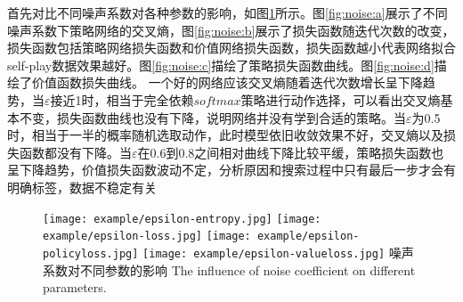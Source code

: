 首先对比不同噪声系数对各种参数的影响，如图\ref{fig:noise}所示。图\ref{fig:noise:a}展示了不同噪声系数下策略网络的交叉熵，图\ref{fig:noise:b}展示了损失函数随迭代次数的改变，损失函数包括策略网络损失函数和价值网络损失函数，损失函数越小代表网络拟合self-play数据效果越好。图\ref{fig:noise:c}描绘了策略损失函数曲线。图\ref{fig:noise:d}描绘了价值函数损失曲线。
一个好的网络应该交叉熵随着迭代次数增长呈下降趋势，当$\varepsilon$接近1时，相当于完全依赖$softmax$策略进行动作选择，可以看出交叉熵基本不变，损失函数曲线也没有下降，说明网络并没有学到合适的策略。当$\varepsilon$为0.5时，相当于一半的概率随机选取动作，此时模型依旧收敛效果不好，交叉熵以及损失函数都没有下降。当$\varepsilon$在0.6到0.8之间相对曲线下降比较平缓，策略损失函数也呈下降趋势，价值损失函数波动不定，分析原因和搜索过程中只有最后一步才会有明确标签，数据不稳定有关

\begin{figure}[htpb]
	\centering
	{\texttt{[image: example/epsilon-entropy.jpg]}}
	\hspace{0.5em}
	{\texttt{[image: example/epsilon-loss.jpg]}}
	\newline
	\centering
	{\texttt{[image: example/epsilon-policyloss.jpg]}}
	\hspace{0.5em}
	{\texttt{[image: example/epsilon-valueloss.jpg]}}
	\bicaption
	{噪声系数对不同参数的影响}
	{The influence of noise coefficient on different parameters.}
	\label{fig:noise}
\end{figure}


